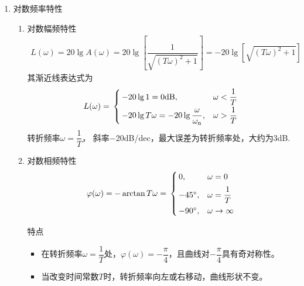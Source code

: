 \begin{enumerate}[1.]
\begin{enumerate}[(1) ]
	\end{enumerate}
	\item 对数频率特性
	\begin{enumerate}[(1) ]
		\item 对数幅频特性
		\vspace*{-0.5em}
		\begin{align}
			L(\omega) = 20 \lg A(\omega) = 20 \lg \left[\dfrac{1}{\sqrt{(T \omega)^2 + 1}}\right] = -20 \lg \left[\sqrt{(T \omega)^2 + 1}\right]
		\end{align}
		其渐近线表达式为
		\begin{align}
			L(\omega) = \,
			\begin{cases}
				\, -20 \lg 1 = 0 \text{dB}, & \omega < \dfrac{1}{T}\\[0.5em]
				\, -20 \lg T\omega = - 20 \lg \dfrac{\omega}{\omega_{\rm{n}}} , & \omega > \dfrac{1}{T}
			\end{cases}
		\end{align}
		转折频率$\omega = \dfrac{1}{T}$， 斜率$-$20dB/dec，最大误差为转折频率处，大约为3dB.
		\item 对数相频特性
		\vspace*{-0.5em}
		\begin{align}
			\varphi(\omega) = -\arctan T\omega = \,
			\begin{cases}
				\, 0, & \omega = 0\\[0.5em]
				\, -45{}^{\circ} , & \omega = \dfrac{1}{T}\\[0.5em]
				\, -90 {}^{\circ}, & \omega \to \infty
			\end{cases}
		\end{align}
		\vspace*{-3em}
		
		特点
		\begin{itemize}
			\item 在转折频率$\omega = \dfrac{1}{T}$处，$\varphi(\omega) =  -\dfrac{\pi}{4}$，且曲线对$-\dfrac{\pi}{4}$具有奇对称性。
			\item 当改变时间常数$T$时，转折频率向左或右移动，曲线形状不变。
		\end{itemize}
	\end{enumerate}
\end{enumerate}



